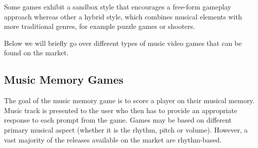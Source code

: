 Some games exhibit a sandbox style that encourages a free-form gameplay approach whereas other a hybrid style, which combines musical elements with more traditional genres, for example puzzle games or shooters. 

Below we will briefly go over different types of music video games that can be found on the market.


\vspace{10pt}


\subsection{Music Memory Games}

The goal of the music memory game is to score a player on their musical memory. Music track is presented to the user who then has to provide an appropriate response to each prompt from the game. Games may be based on different primary musical aspect (whether it is the rhythm, pitch or volume). However, a vast majority of the releases available on the market are rhythm-based.


